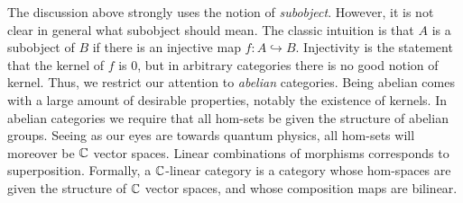 \documentclass{article}
\theoremstyle{definition}
\numberwithin{figure}{section}
\begin{document}
The discussion above strongly uses the notion of \textit{subobject}. However, it is not clear in general what subobject should mean. The classic intuition is that $A$ is a subobject of $B$ if there is an injective map $f:A\hookrightarrow{}B$. Injectivity is the statement that the kernel of $f$ is $0$, but in arbitrary categories there is no good notion of kernel. Thus, we restrict our attention to \textit{abelian} categories. Being abelian comes with a large amount of desirable properties, notably the existence of kernels. In abelian categories we require that all hom-sets be given the structure of abelian groups. Seeing as our eyes are towards quantum physics, all hom-sets will moreover be $\mathbb{C}$ vector spaces. Linear combinations of morphisms corresponds to superposition. Formally, a $\mathbb{C}$-linear category is a category whose hom-spaces are given the structure of $\mathbb{C}$ vector spaces, and whose composition maps are bilinear.
\end{document}
